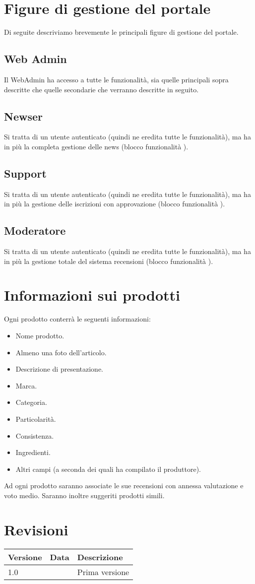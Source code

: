 \section{Figure di gestione del portale}
Di seguite descriviamo brevemente le principali figure di gestione del portale.

\subsection{Web Admin}
Il WebAdmin ha accesso a tutte le funzionalità, sia quelle principali sopra descritte che quelle secondarie che verranno descritte in seguito.

\subsection{Newser}
Si tratta di un utente autenticato (quindi ne eredita tutte le funzionalità), ma ha in più la completa gestione delle news (blocco funzionalità ).

\subsection{Support}
Si tratta di un utente autenticato (quindi ne eredita tutte le funzionalità), ma ha in più la gestione delle iscrizioni con approvazione (blocco funzionalità ).

\subsection{Moderatore}
Si tratta di un utente autenticato (quindi ne eredita tutte le funzionalità), ma ha in più la gestione totale del sistema recensioni (blocco funzionalità ).

\section{Informazioni sui prodotti}
Ogni prodotto conterrà le seguenti informazioni:
\begin{itemize}
	\item Nome prodotto. 
	\item Almeno una foto dell’articolo.
	\item  Descrizione di presentazione.
	\item  Marca.
	\item Categoria.
	\item Particolarità.
	\item Consistenza.
	\item Ingredienti.
	\item Altri campi (a seconda dei quali ha compilato il produttore).
\end{itemize}
Ad ogni prodotto saranno associate le sue recensioni con annessa valutazione e voto medio. Saranno inoltre suggeriti prodotti simili.

\section{Revisioni}
\begin{center}
	\begin{tabular}{lll}
		\toprule
		Versione & Data & Descrizione \\
		\midrule
		1.0 & \displaydate{versioneuno} & Prima versione \\
		\bottomrule
	\end{tabular}
\end{center}
